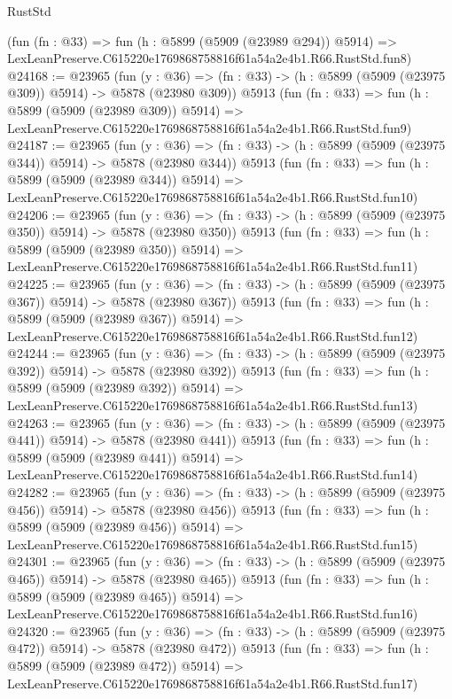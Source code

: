 \begin{lexlean}{RustStd}
\begin{coremodule}
{{    (fun (fn : @33) =>
    fun (h : @5899 (@5909 (@23989 @294)) @5914) =>
    LexLeanPreserve.C615220e1769868758816f61a54a2e4b1.R66.RustStd.fun8)
@24168 := @23965
    (fun (y : @36) => (fn : @33) -> (h : @5899 (@5909 (@23975 @309)) @5914) -> @5878 (@23980 @309))
    @5913
    (fun (fn : @33) =>
    fun (h : @5899 (@5909 (@23989 @309)) @5914) =>
    LexLeanPreserve.C615220e1769868758816f61a54a2e4b1.R66.RustStd.fun9)
@24187 := @23965
    (fun (y : @36) => (fn : @33) -> (h : @5899 (@5909 (@23975 @344)) @5914) -> @5878 (@23980 @344))
    @5913
    (fun (fn : @33) =>
    fun (h : @5899 (@5909 (@23989 @344)) @5914) =>
    LexLeanPreserve.C615220e1769868758816f61a54a2e4b1.R66.RustStd.fun10)
@24206 := @23965
    (fun (y : @36) => (fn : @33) -> (h : @5899 (@5909 (@23975 @350)) @5914) -> @5878 (@23980 @350))
    @5913
    (fun (fn : @33) =>
    fun (h : @5899 (@5909 (@23989 @350)) @5914) =>
    LexLeanPreserve.C615220e1769868758816f61a54a2e4b1.R66.RustStd.fun11)
@24225 := @23965
    (fun (y : @36) => (fn : @33) -> (h : @5899 (@5909 (@23975 @367)) @5914) -> @5878 (@23980 @367))
    @5913
    (fun (fn : @33) =>
    fun (h : @5899 (@5909 (@23989 @367)) @5914) =>
    LexLeanPreserve.C615220e1769868758816f61a54a2e4b1.R66.RustStd.fun12)
@24244 := @23965
    (fun (y : @36) => (fn : @33) -> (h : @5899 (@5909 (@23975 @392)) @5914) -> @5878 (@23980 @392))
    @5913
    (fun (fn : @33) =>
    fun (h : @5899 (@5909 (@23989 @392)) @5914) =>
    LexLeanPreserve.C615220e1769868758816f61a54a2e4b1.R66.RustStd.fun13)
@24263 := @23965
    (fun (y : @36) => (fn : @33) -> (h : @5899 (@5909 (@23975 @441)) @5914) -> @5878 (@23980 @441))
    @5913
    (fun (fn : @33) =>
    fun (h : @5899 (@5909 (@23989 @441)) @5914) =>
    LexLeanPreserve.C615220e1769868758816f61a54a2e4b1.R66.RustStd.fun14)
@24282 := @23965
    (fun (y : @36) => (fn : @33) -> (h : @5899 (@5909 (@23975 @456)) @5914) -> @5878 (@23980 @456))
    @5913
    (fun (fn : @33) =>
    fun (h : @5899 (@5909 (@23989 @456)) @5914) =>
    LexLeanPreserve.C615220e1769868758816f61a54a2e4b1.R66.RustStd.fun15)
@24301 := @23965
    (fun (y : @36) => (fn : @33) -> (h : @5899 (@5909 (@23975 @465)) @5914) -> @5878 (@23980 @465))
    @5913
    (fun (fn : @33) =>
    fun (h : @5899 (@5909 (@23989 @465)) @5914) =>
    LexLeanPreserve.C615220e1769868758816f61a54a2e4b1.R66.RustStd.fun16)
@24320 := @23965
    (fun (y : @36) => (fn : @33) -> (h : @5899 (@5909 (@23975 @472)) @5914) -> @5878 (@23980 @472))
    @5913
    (fun (fn : @33) =>
    fun (h : @5899 (@5909 (@23989 @472)) @5914) =>
    LexLeanPreserve.C615220e1769868758816f61a54a2e4b1.R66.RustStd.fun17)
}}
\end{coremodule}
\end{lexlean}
